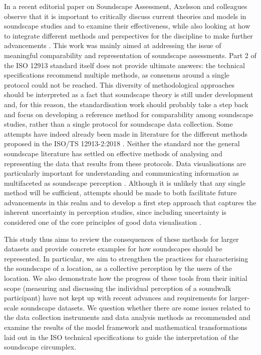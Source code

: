 \documentclass[
  authoryear,
  preprint,
  3p]{elsarticle}
\begin{document}
In a recent editorial paper on Soundscape Assessment, Axelsson and
colleagues observe that it is important to critically discuss current
theories and models in soundscape studies and to examine their
effectiveness, while also looking at how to integrate different methods
and perspectives for the discipline to make further advancements
\citep{Axelsson2019editorial}. This work was mainly aimed at addressing
the issue of meaningful comparability and representation of soundscape
assessments. Part 2 of the ISO 12913 standard itself does not provide
ultimate answers: the technical specifications recommend multiple
methods, as consensus around a single protocol could not be reached.
This diversity of methodological approaches should be interpreted as a
fact that soundscape theory is still under development and, for this
reason, the standardisation work should probably take a step back and
focus on developing a reference method for comparability among
soundscape studies, rather than a single protocol for soundscape data
collection. Some attempts have indeed already been made in literature
for the different methods proposed in the ISO/TS 12913-2:2018
\citep[@jo2020soundscape]{aletta2019exploring}. Neither the standard nor
the general soundscape literature has settled on effective methods of
analysing and representing the data that results from these protocols.
Data visualisations are particularly important for understanding and
communicating information as multifaceted as soundscape perception
\citep{tufte2001visual}. Although it is unlikely that any single method
will be sufficient, attempts should be made to both facilitate future
advancements in this realm and to develop a first step approach that
captures the inherent uncertainty in perception studies, since including
uncertainty is considered one of the core principles of good data
visualisation \citep{Midway2020Principles}.

This study thus aims to review the consequences of these methods for
larger datasets and provide concrete examples for how soundscapes should
be represented. In particular, we aim to strengthen the practices for
characterising the soundscape of a location, as a collective perception
by the users of the location. We also demonstrate how the progress of
these tools from their initial scope (measuring and discussing the
individual perception of a soundwalk participant) have not kept up with
recent advances and requirements for larger-scale soundscape datasets.
We question whether there are some issues related to the data collection
instruments and data analysis methods as recommended and examine the
results of the model framework and mathematical transformations laid out
in the ISO technical specifications to guide the interpretation of the
soundscape circumplex.
\end{document}
